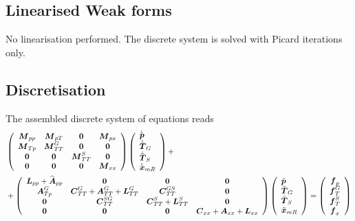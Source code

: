 \subsection{Linearised Weak forms}
No linearisation performed. The discrete system is solved with Picard iterations only.

\subsection{Discretisation}

The assembled discrete system of equations reads
\begin{align}
	&\left(
		\begin{array}{cccc}
			\mbf{M}_{pp} & \mbf{M}_{pT} & \mbf{0} & \mbf{M}_{px}\\
			\mbf{M}_{Tp} & \mbf{M}_{TT}^G & \mbf{0} & \mbf{0}\\
			\mbf{0} & \mbf{0} & \mbf{M}_{TT}^S & \mbf{0}\\
			\mbf{0} & \mbf{0} & \mbf{0} & \mbf{M}_{xx}
		\end{array}
	\right)
	\left(
		\begin{array}{l}
			\dot{\tilde{\mbf{p}}}\\
			\dot{\tilde{\mbf{T}}}_G\\
			\dot{\tilde{\mbf{T}}}_S\\
			\dot{\tilde{\mbf{x}}}_{mR}
		\end{array}
	\right)
	+ \label{eq:final_fe}\\
	&+ \left(
		\begin{array}{cccc}
			\mbf{L}_{pp} + \widehat{\mbf{A}}_{pp} & \mbf{0} & \mbf{0} & \mbf{0}\\
			\mbf{A}_{Tp}^G & \mbf{C}_{TT}^G + \mbf{A}_{TT}^G + \mbf{L}_{TT}^G & \mbf{C}_{TT}^{GS} & \mbf{0}\\
			\mbf{0} & \mbf{C}_{TT}^{SG} & \mbf{C}_{TT}^S + \mbf{L}_{TT}^S & \mbf{0}\\
			\mbf{0} & \mbf{0} & \mbf{0} & \mbf{C}_{xx} + \mbf{A}_{xx} + \mbf{L}_{xx}
		\end{array}
	\right)
	\left(
		\begin{array}{l}
			{\tilde{\mbf{p}}}\\
			{\tilde{\mbf{T}}}_G\\
			{\tilde{\mbf{T}}}_S\\
			{\tilde{\mbf{x}}}_{mR}
		\end{array}
	\right)
	=
	\left(
		\begin{array}{cccc}
			\mbf{f}_p\\
			\mbf{f}_T^G\\
			\mbf{f}_T^S\\
			\mbf{f}_x
		\end{array}
	\right) \nn
\end{align}

